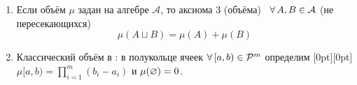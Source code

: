 \begin{zam}[https://www.youtube.com/live/OdDauqCjZt0?si=FAQVHL0Lo4sE8G_G&t=8241]
	\begin{enumerate}\makeatletter\renewcommand{\p@enumi}{\thezam.}\makeatother
	\item Если объём $\mu$ задан на алгебре $\mathcal A$, то аксиома 3 (объёма) \eq\ $\forall \, A, B \in \mathcal A$ (не пересекающихся) \[\mu(A \sqcup B) = \mu(A) + \mu(B)\]
	
	\item\label{класс.объем} Классический объём в \rmm: в полукольце ячеек $\forall \, [a, b) \in \mathcal{P}^m$ определим \raisebox{0pt}[0pt][0pt]{$\mu[a, b) = \prod\limits_{i = 1}^m (b_i - a_i)$} и $\mu(\varnothing) = 0$. 
	\end{enumerate}
\end{zam}

